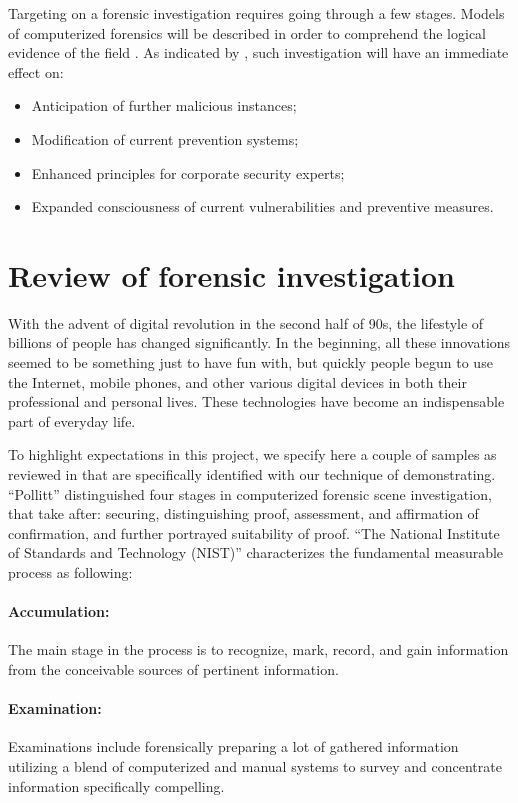 Targeting on a forensic investigation requires going through a few stages. Models of computerized forensics will be described in order to comprehend the logical evidence of the field \cite{3}. As indicated by \cite{4}, such investigation will have an immediate effect on:

\begin{itemize}
\item Anticipation of further malicious instances;
\item Modification of current prevention systems;
\item Enhanced principles for corporate security experts;
\item Expanded consciousness of current vulnerabilities and preventive measures.
\end{itemize}


\section{Review of forensic investigation} 
With the advent of digital revolution in the second half of 90s, the lifestyle of billions of people has changed significantly. In the beginning, all these innovations seemed to be something just to have fun with, but quickly people begun to use the Internet, mobile phones, and other various digital devices in both their professional and personal lives. These technologies have become an indispensable part of everyday life. 

To highlight expectations in this project, we specify here a couple of samples as reviewed in that are specifically identified with our technique of demonstrating. “Pollitt” \cite{3} distinguished four stages in computerized forensic scene investigation, that take after: securing, distinguishing proof, assessment, and affirmation of confirmation, and further portrayed suitability of proof. “The National Institute of Standards and Technology (NIST)” \cite{20} characterizes the fundamental measurable process as following: 

\paragraph{Accumulation:} 
The main stage in the process is to recognize, mark, record, and gain information from the conceivable sources of pertinent information. 

\paragraph{Examination:}
Examinations include forensically preparing a lot of gathered information utilizing a blend of computerized and manual systems to survey and concentrate information specifically compelling. 

